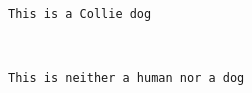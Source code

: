 \documentclass[11pt]{article}
\begin{document}
    \begin{Verbatim}[commandchars=\\\{\}]
This is a Collie dog

    \end{Verbatim}

    \begin{center}
    \end{center}
    { \hspace*{\fill} \\}
    
    \begin{Verbatim}[commandchars=\\\{\}]
This is neither a human nor a dog

    \end{Verbatim}


    
    
    
    
\end{document}
